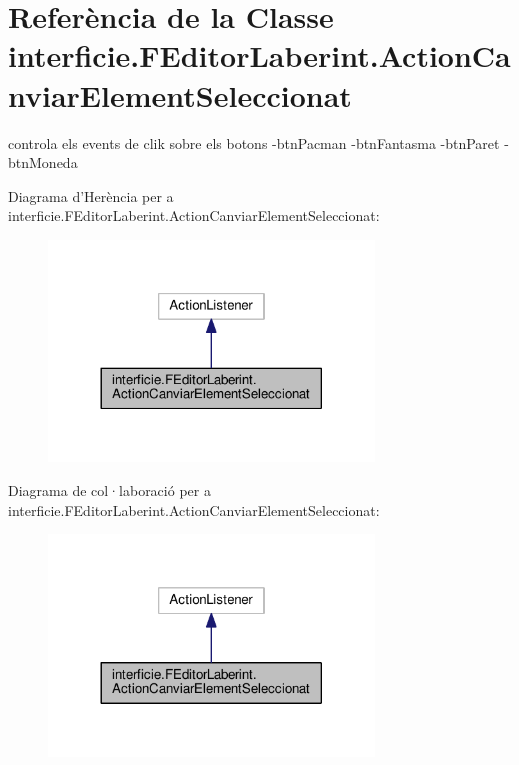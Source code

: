 \hypertarget{classinterficie_1_1_f_editor_laberint_1_1_action_canviar_element_seleccionat}{\section{Referència de la Classe interficie.\+F\+Editor\+Laberint.\+Action\+Canviar\+Element\+Seleccionat}
\label{classinterficie_1_1_f_editor_laberint_1_1_action_canviar_element_seleccionat}
}


controla els events de clik sobre els botons -\/btn\+Pacman -\/btn\+Fantasma -\/btn\+Paret -\/btn\+Moneda  




Diagrama d'Herència per a interficie.\+F\+Editor\+Laberint.\+Action\+Canviar\+Element\+Seleccionat\+:
\nopagebreak
\begin{figure}[H]
\begin{center}
\leavevmode
\includegraphics[width=245pt]{classinterficie_1_1_f_editor_laberint_1_1_action_canviar_element_seleccionat__inherit__graph}
\end{center}
\end{figure}


Diagrama de col·laboració per a interficie.\+F\+Editor\+Laberint.\+Action\+Canviar\+Element\+Seleccionat\+:
\nopagebreak
\begin{figure}[H]
\begin{center}
\leavevmode
\includegraphics[width=245pt]{classinterficie_1_1_f_editor_laberint_1_1_action_canviar_element_seleccionat__coll__graph}
\end{center}
\end{figure}
